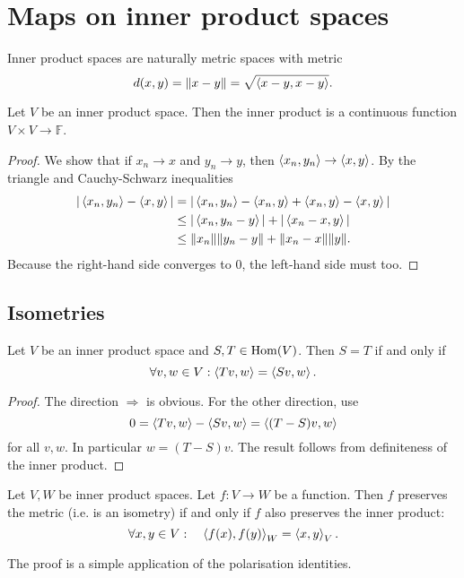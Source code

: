 \section{Maps on inner product spaces}
Inner product spaces are naturally metric spaces with metric 
\[ d(x,y) = \lVert x-y\rVert = \sqrt{\left\langle x-y, x-y \right\rangle}. \]

\begin{lemma}
Let $V$ be an inner product space. Then the inner product is a continuous function $V\times V \to \mathbb{F}$.
\end{lemma}
\begin{proof}
We show that if $x_n \to x$ and $y_n \to y$, then $\left\langle x_n,y_n \right\rangle\to \left\langle x,y \right\rangle$. By the triangle and Cauchy-Schwarz inequalities
\begin{align*}
|\left\langle x_n,y_n \right\rangle-\left\langle x,y \right\rangle| &= |\left\langle x_n,y_n \right\rangle-\left\langle x_n,y \right\rangle+\left\langle x_n,y \right\rangle - \left\langle x,y \right\rangle| \\
&\leq |\left\langle x_n, y_n-y \right\rangle| + |\left\langle x_n-x, y \right\rangle| \\
&\leq \lVert x_n\rVert\lVert y_n-y\rVert + \lVert x_n-x\rVert\lVert y\rVert.
\end{align*}
Because the right-hand side converges to $0$, the left-hand side must too.
\end{proof}

\subsection{Isometries}
\begin{lemma} \label{lemma:equalityOfMapsInnerProductSpaces}
Let $V$ be an inner product space and $S,T\in\operatorname{Hom}(V)$. Then $S=T$ \textup{if and only if}
\[ \forall v,w\in V: \left\langle Tv,w \right\rangle = \left\langle Sv,w \right\rangle. \]
\end{lemma}
\begin{proof}
The direction $\boxed{\Rightarrow}$ is obvious. For the other direction, use
\[ 0 = \left\langle Tv,w \right\rangle - \left\langle Sv,w \right\rangle = \left\langle (T-S)v,w \right\rangle \]
for all $v,w$. In particular $w=(T-S)v$. The result follows from definiteness of the inner product.
\end{proof}

\begin{lemma}
Let $V,W$ be inner product spaces. Let $f:V\to W$ be a function. Then $f$ preserves the metric (i.e. is an isometry) \textup{if and only if} $f$ also preserves the inner product:
\[ \forall x,y \in V: \quad \left\langle f(x),f(y) \right\rangle_W = \left\langle x,y \right\rangle_V. \]
\end{lemma}
The proof is a simple application of the polarisation identities.

